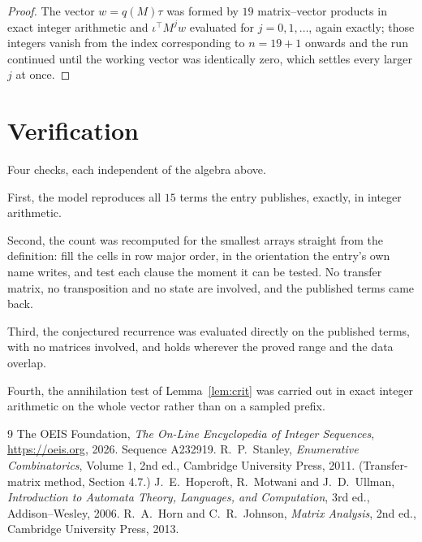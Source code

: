 \documentclass[11pt,a4paper]{article}
\theoremstyle{plain}
\theoremstyle{definition}
\begin{document}
\begin{proof}
The vector $w=q(M)\tau$ was formed by $19$ matrix--vector products in exact integer
arithmetic and $\iota^{\!\top}M^{j}w$ evaluated for $j=0,1,\dots$, again exactly; those
integers vanish from the index corresponding to $n=19+1$ onwards and the run continued
until the working vector was identically zero, which settles every larger $j$ at once.
\end{proof}

\section{Verification}

Four checks, each independent of the algebra above.

First, the model reproduces all $15$ terms the entry publishes, exactly, in integer
arithmetic.

Second, the count was recomputed for the smallest arrays straight from the definition: fill the
cells in row major order, in the orientation the entry's own name writes, and test each clause
the moment it can be tested. No transfer matrix, no transposition and no state are involved,
and the published terms came back.

Third, the conjectured recurrence was evaluated directly on the published terms, with no
matrices involved, and holds wherever the proved range and the data overlap.

Fourth, the annihilation test of Lemma~\ref{lem:crit} was carried out in exact integer
arithmetic on the whole vector rather than on a sampled prefix.

\begin{thebibliography}{9}
 The OEIS Foundation, \emph{The On-Line Encyclopedia of Integer
Sequences}, \url{https://oeis.org}, 2026. Sequence A232919.
 R.~P.~Stanley, \emph{Enumerative Combinatorics}, Volume 1, 2nd ed.,
Cambridge University Press, 2011. (Transfer-matrix method, Section 4.7.)
 J.~E.~Hopcroft, R.~Motwani and J.~D.~Ullman, \emph{Introduction to Automata
Theory, Languages, and Computation}, 3rd ed., Addison--Wesley, 2006.
 R.~A.~Horn and C.~R.~Johnson, \emph{Matrix Analysis}, 2nd ed., Cambridge
University Press, 2013.
\end{thebibliography}
\end{document}
